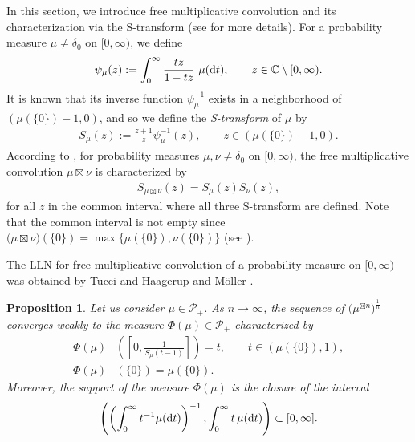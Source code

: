 \documentclass[pdftex]{sigma}
\newtheorem{Proposition}[Theorem]{Proposition}
 { \theoremstyle{definition}
\newtheorem{Definition}[Theorem]{Definition}
\newtheorem{Note}[Theorem]{Note}
\newtheorem{Example}[Theorem]{Example}
\newtheorem{Remark}[Theorem]{Remark}
\newtheorem{Conjecture}[Theorem]{Conjecture}}
\numberwithin{equation}{section}
\newcommand{\calP}{\mathcal{P}}
\begin{document}
In this section, we introduce free multiplicative convolution and its characterization via the S-transform (see \cite{BV93} for more details). For a probability measure $\mu\neq \delta_0$ on $[0,\infty)$, we define
\begin{align*}
\psi_\mu(z):=\int_0^\infty \frac{tz}{1-tz}\ \mu({\rm d}t), \qquad z\in \mathbb{C}\setminus [0,\infty).
\end{align*}
It is known that its inverse function $\psi_\mu^{-1}$ exists in a neighborhood of $(\mu(\{0\})-1,0)$, and so we define the {\it S-transform} of $\mu$ by
\begin{align*}
S_\mu(z):=\frac{z+1}{z}\psi_\mu^{-1}(z), \qquad z\in (\mu(\{0\})-1,0).
\end{align*}
According to \cite{BV93}, for probability measures $\mu,\nu\neq \delta_0$ on $[0,\infty)$, the free multiplicative convolution $\mu\boxtimes \nu$ is characterized by
\begin{align*}
S_{\mu\boxtimes \nu}(z)=S_\mu(z)S_\nu(z),
\end{align*}
for all $z$ in the common interval where all three S-transform are defined. Note that the common interval is not empty since $\big(\mu\boxtimes \nu\big)(\{0\})=\max\{\mu(\{0\}),\nu(\{0\})\}$ (see \cite[Lemma 6.9]{BV93}).


The LLN for free multiplicative convolution of a probability measure on $[0,\infty)$ was obtained by Tucci \cite{Tucci10} and Haagerup and M\"{o}ller \cite{HM13}.

\begin{Proposition}\label{prop:HMlimit}
Let us consider $\mu\in \calP_+$. As $n\rightarrow\infty$, the sequence of $\big(\mu^{\boxtimes n}\big)^{\frac{1}{n}}$ converges weakly to the measure $\Phi(\mu)\in\calP_+$ characterized by
\begin{align*}%
\Phi(\mu)&\left(\left[0,\frac{1}{S_\mu(t-1)}\right]\right)=t, \qquad t\in (\mu(\{0\}),1),\\
\Phi(\mu)&(\{0\})=\mu(\{0\}).
\end{align*}
Moreover, the support of the measure $\Phi(\mu)$ is the closure of the interval
\begin{align*}
\left(\left(\int_0^\infty t^{-1}  \mu({\rm d}t)\right)^{-1}, \int_0^\infty t \, \mu({\rm d}t)\right) \subset [0,\infty].
\end{align*}
\end{Proposition}
\end{document}

